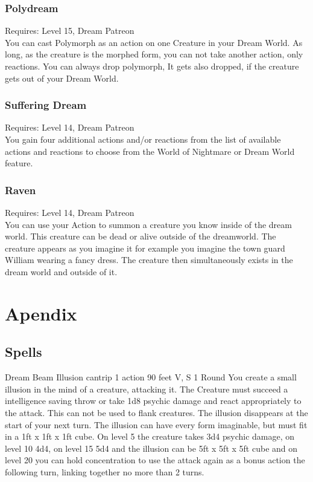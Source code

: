 \documentclass[a4paper,10pt,twoside,twocolumn]{dndbook} %
\begin{document}
	\subsection{Polydream}
	Requires: Level 15, Dream Patreon\\
	You can cast Polymorph as an action on one Creature in your Dream World. As long, as the creature is the morphed form, you can not take another action, only reactions. You can always drop polymorph, It gets also dropped, if the creature gets out of your Dream World.
	\subsection{Suffering Dream}
	Requires: Level 14, Dream Patreon\\
	You gain four additional actions and/or reactions from the list of available actions and reactions to choose from the World of Nightmare or Dream World feature.
	\subsection{Raven}
	Requires: Level 14, Dream Patreon\\
	You can use your Action to summon a creature you know inside of the dream world. This creature can be dead or alive outside of the dreamworld. The creature appears as you imagine it for example you imagine the town guard William wearing a fancy dress. The creature then simultaneously exists in the dream world and outside of it.
	\chapter{Apendix}
	\section{Spells}
	\DndSpellHeader%
	{Dream Beam}
	{Illusion cantrip}
	{1 action}
	{90 feet}
	{V, S}
	{1 Round}
	You create a small illusion in the mind of a creature, attacking it. The Creature must succeed a intelligence saving throw or take 1d8 psychic damage and react appropriately to the attack. This can not be used to flank creatures. The illusion disappears at the start of your next turn. The illusion can have every form imaginable, but must fit in a 1ft x 1ft x 1ft cube.\linebreak\linebreak
	On level 5 the creature takes 3d4 psychic damage, on level 10 4d4, on level 15 5d4 and the illusion can be 5ft x 5ft x 5ft cube and on level 20 you can hold concentration to use the attack again as a bonus action the following turn, linking together no more than 2 turns.
	
\end{document}
